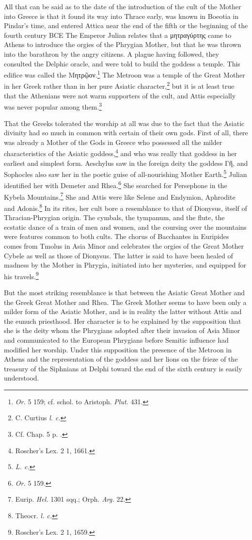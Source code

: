 \documentclass[a4paper, 11pt, oneside, polutonikogreek, english]{article}
\begin{document}
All that can be said as to the date of the introduction of the cult of the Mother into Greece is that it found its way into Thrace early, was known in Boeotia in Pindar's time, and entered Attica near the end of the fifth or the beginning of the fourth century \textsc{BCE} The Emperor Julian relates that a μητραγύρτης came to Athens to introduce the orgies of the Phrygian Mother, but that he was thrown into the barathron by the angry citizens. A plague having followed, they consulted the Delphic oracle, and were told to build the goddess a temple. This edifice was called the Μητρῷον.\footnote{\emph{Or.} 5 159; cf. schol. to Aristoph. \emph{Plut.} 431.} The Metroon was a temple of the Great Mother in her Greek rather than in her pure Asiatic character,\footnote{C. Curtius \emph{l. c.}} but it is at least true that the Athenians were not warm supporters of the cult, and Attis especially was never popular among them.\footnote{Cf. Chap. 5 p. .}

That the Greeks tolerated the worship at all was due to the fact that the Asiatic divinity had so much in common with certain of their own gods. First of all, there was already a Mother of the Gods in Greece who possessed all the milder characteristics of the Asiatic goddess,\footnote{Roscher's Lex. 2 1, 1661.} and who was really that goddess in her earliest and simplest form. Aeschylus saw in the foreign deity the goddess Γῆ, and Sophocles also saw her in the poetic guise of all-nourishing Mother Earth.\footnote{\emph{L. c.}} Julian identified her with Demeter and Rhea.\footnote{\emph{Or.} 5 159.} She searched for Persephone in the Kybela Mountains.\footnote{Eurip. \emph{Hel.} 1301 sqq.; Orph. \emph{Arg.} 22.} She and Attis were like Selene and Endymion, Aphrodite and Adonis.\footnote{Theocr. \emph{l. c.}} In its rites, her cult bore a resemblance to that of Dionysus, itself of Thracian-Phrygian origin. The cymbals, the tympanum, and the flute, the ecstatic dance of a train of men and women, and the coursing over the mountains were features common to both cults. The chorus of Bacchantes in Euripides comes from Tmolus in Asia Minor and celebrates the orgies of the Great Mother Cybele as well as those of Dionysus. The latter is said to have been healed of madness by the Mother in Phrygia, initiated into her mysteries, and equipped for his travels.\footnote{Roscher's Lex. 2 1, 1659.}

But the most striking resemblance is that between the Asiatic Great Mother and the Greek Great Mother and Rhea. The Greek Mother seems to have been only a milder form of the Asiatic Mother, and is in reality the latter without Attis and the eunuch priesthood. Her character is to be explained by the supposition that she is the deity whom the Phrygians adopted after their invasion of Asia Minor and communicated to the European Phrygians before Semitic influence had modified her worship. Under this supposition the presence of the Metroon in Athens and the representation of the goddess and her lions on the frieze of the treasury of the Siphnians at Delphi toward the end of the sixth century is easily understood.
\end{document}
